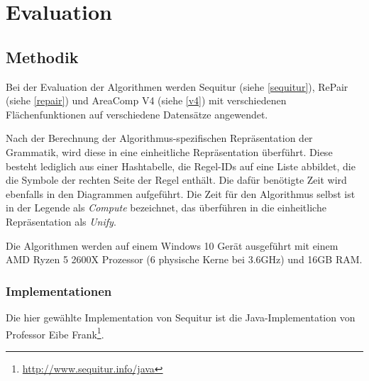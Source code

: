 


\chapter{Evaluation}

\section{Methodik}

Bei der Evaluation der Algorithmen werden Sequitur (siehe \autoref{sequitur}), RePair (siehe \autoref{repair}) und AreaComp V4 (siehe \autoref{v4}) mit verschiedenen Flächenfunktionen auf verschiedene Datensätze angewendet. 

Nach der Berechnung der Algorithmus-spezifischen Repräsentation der Grammatik, wird diese in eine einheitliche Repräsentation überführt. Diese besteht lediglich aus einer Hashtabelle, die Regel-IDs auf eine Liste abbildet, die die Symbole der rechten Seite der Regel enthält. Die dafür benötigte Zeit wird ebenfalls in den Diagrammen aufgeführt. Die Zeit für den Algorithmus selbst ist in der Legende als \emph{Compute} bezeichnet, das überführen in die einheitliche Repräsentation als \emph{Unify}.

Die Algorithmen werden auf einem Windows 10 Gerät ausgeführt mit einem AMD Ryzen 5 2600X Prozessor (6 physische Kerne bei 3.6GHz) und 16GB RAM.

\subsection{Implementationen}

Die hier gewählte Implementation von Sequitur ist die Java-Implementation von Professor Eibe Frank\footnote{\url{http://www.sequitur.info/java}}. 

